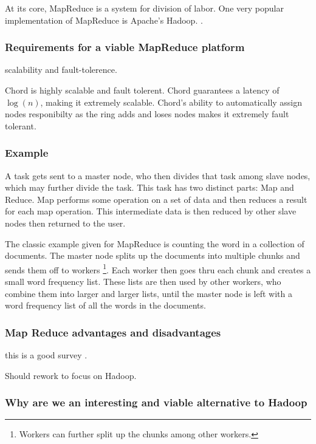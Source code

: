 \documentclass[conference, compsocconf, letterpaper]{IEEEtran}
\begin{document}
At its core, MapReduce \cite{mapreduce} is a system for division of labor.  One very popular implementation of MapReduce is  Apache's Hadoop. \cite{hadoop}.


\subsubsection{Requirements for a viable MapReduce platform}
scalability and fault-tolerence.

Chord is highly scalable and fault tolerent.  Chord guarantees a latency of $\log(n)$, making it extremely scalable.  Chord's ability to automatically assign nodes responibilty as the ring adds and loses nodes makes it extremely fault tolerant.  

\subsubsection{Example}

A task gets sent to a master node, who then divides that task among slave nodes, which may further divide the task.  This task has two distinct parts: Map and Reduce.  Map performs some operation on a set of data and then reduces a result for each map operation.  This intermediate data is then reduced by other slave nodes then returned to the user. 

The classic example given for MapReduce is counting the word in a collection of documents.  The master node splits up the documents into multiple chunks and sends them off to workers  \footnote{Workers can further split up the chunks among other workers.}.  Each worker then goes thru each chunk and creates a small word frequency list.  These lists are then used by other workers, who combine them into larger and larger lists, until the master node is left with a word frequency list of all the words in the documents. 






\subsubsection{Map Reduce advantages and disadvantages}
this is a good survey \cite{mrsurvey}.

Should rework to focus on Hadoop.

\subsubsection{Why are we an interesting and viable alternative to Hadoop}
\end{document}
